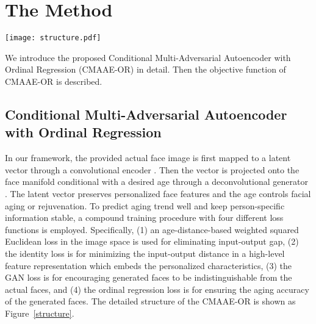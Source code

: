 \documentclass{article}
\begin{document}
\section{The Method}\label{approach}

\begin{figure*}[ht!]
\centering
\texttt{[image: structure.pdf]}
\caption{Structure of the proposed CMAAE-OR framework for facial aging and rejuvenation. A convolutional encoder  and a deconvolutional generator  learn the age transformation in tandem. The training of CMAAE-OR incorporates four different losses: (1) the GAN loss that encourages generated faces to be indistinguishable from the provided actual faces, (2) the ordinal regression loss that makes generated faces exhibit desirable aging effect, (3) the weighted squared Euclidean loss in the image space that eliminates the input-output gap, and (4) the identity loss to minimizes the input-output distance by a latent features , which embeds personalized characteristics.}
\label{structure}
\end{figure*}

We introduce the proposed Conditional Multi-Adversarial Autoencoder with Ordinal Regression (CMAAE-OR) in detail. Then the objective function of CMAAE-OR is described.

\subsection{Conditional Multi-Adversarial Autoencoder with Ordinal Regression}\label{CMAAE}
In our framework, the provided actual face image is first mapped to a latent vector through a convolutional encoder . Then the vector is projected onto the face manifold conditional with a desired age through a deconvolutional generator . The latent vector preserves personalized face features and the age controls facial aging or rejuvenation. To predict aging trend well and keep person-specific information stable, a compound training procedure with four different loss functions is employed. Specifically, (1) an age-distance-based weighted squared Euclidean loss in the image space is used for eliminating input-output gap, (2) the identity loss is for minimizing the input-output distance in a high-level feature representation which embeds the personalized characteristics, (3) the GAN loss is for encouraging generated faces to be indistinguishable from the actual faces, and (4) the ordinal regression loss is for ensuring the aging accuracy of the generated faces. The detailed structure of the CMAAE-OR is shown as Figure~\ref{structure}.
\end{document}
